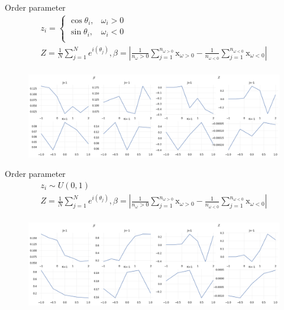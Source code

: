 \documentclass[10pt,aspectratio=43,mathserif,table]{beamer}
\begin{document}
\begin{frame}{Order parameter}
    $$
    \begin{array}{c}
        z_i=\begin{cases}
        \cos \theta _i,&		\omega _i>0\\
        \sin \theta _i,&		\omega _i<0\\
    \end{cases}\\
        Z=\frac{1}{N}\sum_{j=1}^N{e^{i\left( \theta _j \right)}},  \beta =\left| \frac{1}{n_{\omega}>0}\sum_{j=1}^{n_{\omega >0}}{\mathrm{x}_{\omega >0}}-\frac{1}{n_{\omega <0}}\sum_{j=1}^{n_{\omega <0}}{\mathrm{x}_{\omega <0}} \right|\\
    \end{array}
    $$
    \begin{figure}
        \centering
        \includegraphics[width=\textwidth]{ChiralSwarmalators3DbetaZ.png}
    \end{figure}
\end{frame}

\begin{frame}{Order parameter}
    $$
    \begin{array}{c}
        z_i\sim U\left( 0,1 \right)\\
        Z=\frac{1}{N}\sum_{j=1}^N{e^{i\left( \theta _j \right)}},  \beta =\left| \frac{1}{n_{\omega}>0}\sum_{j=1}^{n_{\omega >0}}{\mathrm{x}_{\omega >0}}-\frac{1}{n_{\omega <0}}\sum_{j=1}^{n_{\omega <0}}{\mathrm{x}_{\omega <0}} \right|\\
    \end{array}
    $$

    \begin{figure}
        \centering
        \includegraphics[width=\textwidth]{ChiralSwarmalators3DUrandbetaZ.png}
    \end{figure}
\end{frame}
\end{document}
